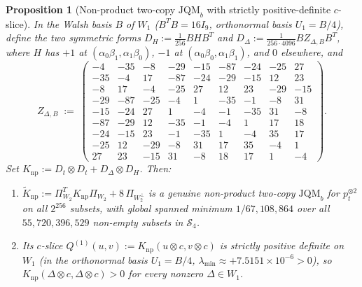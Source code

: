 \documentclass[11pt,a4paper]{article}
\newtheorem{proposition}[theorem]{Proposition}
\theoremstyle{definition}
\theoremstyle{remark}
\newcommand{\JQMb}{\mathrm{JQM}_b}
\begin{document}
\begin{proposition}[Non-product two-copy $\JQMb$ with strictly positive-definite $c$-slice]\label{p:nonprod}
In the Walsh basis $B$ of $W_1$ ($B^T B = 16 I_9$, orthonormal basis $U_1 = B/4$), define the two symmetric forms $D_H := \frac{1}{256} B H B^T$ and $D_\Delta := \frac{1}{256 \cdot 4096} B Z_{\Delta,B} B^T$, where $H$ has $+1$ at $(\alpha_0\beta_1, \alpha_1\beta_0)$, $-1$ at $(\alpha_0\beta_0, \alpha_1\beta_1)$, and $0$ elsewhere, and
{\small
\[
  Z_{\Delta,B} \;:=\;
  \begin{pmatrix}
   -4 & -35 &  -8 & -29 & -15 & -87 & -24 & -25 &  27 \\
  -35 &  -4 &  17 & -87 & -24 & -29 & -15 &  12 &  23 \\
   -8 &  17 &  -4 & -25 &  27 &  12 &  23 & -29 & -15 \\
  -29 & -87 & -25 &  -4 &   1 & -35 &  -1 &  -8 &  31 \\
  -15 & -24 &  27 &   1 &  -4 &  -1 & -35 &  31 &  -8 \\
  -87 & -29 &  12 & -35 &  -1 &  -4 &   1 &  17 &  18 \\
  -24 & -15 &  23 &  -1 & -35 &   1 &  -4 &  35 &  17 \\
  -25 &  12 & -29 &  -8 &  31 &  17 &  35 &  -4 &   1 \\
   27 &  23 & -15 &  31 &  -8 &  18 &  17 &   1 &  -4
  \end{pmatrix}.
\]}
Set $K_{\mathrm{np}} := D_t \otimes D_t + D_\Delta \otimes D_H$. Then:
\begin{enumerate}
  \item[(a)] $\widetilde{K}_{\mathrm{np}} := \Pi_{W_2}^T K_{\mathrm{np}} \Pi_{W_2} + 8\,\Pi_{W_2^\perp}$ is a genuine non-product two-copy $\JQMb$ for $p_t^{\otimes 2}$ on all $2^{256}$ subsets, with global spanned minimum $1/67{,}108{,}864$ over all $55{,}720{,}396{,}529$ non-empty subsets in $\mathcal{S}_4$.
  \item[(b)] Its $c$-slice $Q^{(1)}(u, v) := K_{\mathrm{np}}(u \otimes c, v \otimes c)$ is strictly positive definite on $W_1$ (in the orthonormal basis $U_1 = B/4$, $\lambda_{\min} \approx +7.5151 \times 10^{-6} > 0$), so $K_{\mathrm{np}}(\Delta \otimes c, \Delta \otimes c) > 0$ for every nonzero $\Delta \in W_1$.
\end{enumerate}
\end{proposition}
\end{document}
